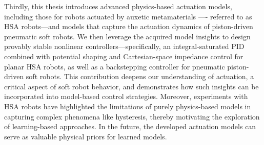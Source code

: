 Thirdly, this thesis introduces advanced physics-based actuation models, including those for robots actuated by auxetic metamaterials —- referred to as \gls{HSA} robots—and models that capture the actuation dynamics of piston-driven pneumatic soft robots. We then leverage the acquired model insights to design provably stable nonlinear controllers—specifically, an integral-saturated PID combined with potential shaping and Cartesian-space impedance control for planar \gls{HSA} robots, as well as a backstepping controller for pneumatic piston-driven soft robots. This contribution deepens our understanding of actuation, a critical aspect of soft robot behavior, and demonstrates how such insights can be incorporated into model-based control strategies. Moreover, experiments with \gls{HSA} robots have highlighted the limitations of purely physics-based models in capturing complex phenomena like hysteresis, thereby motivating the exploration of learning-based approaches. In the future, the developed actuation models can serve as valuable physical priors for learned models.

